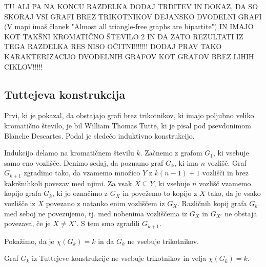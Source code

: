 \documentclass[mat1, tisk]{fmfdelo}
\begin{document}
TU ALI PA NA KONCU RAZDELKA DODAJ TRDITEV IN DOKAZ, DA SO SKORAJ VSI GRAFI BREZ TRIKOTNIKOV DEJANSKO DVODELNI GRAFI (V mapi imaš članek
"Almost all triangle-free graphs are bipartite") IN IMAJO KOT TAKŠNI KROMATIČNO ŠTEVILO 2 IN DA ZATO REZULTATI IZ TEGA RAZDELKA RES NISO 
OČITNI!!!!!!! DODAJ PRAV TAKO KARAKTERIZACIJO DVODELNIH GRAFOV KOT GRAFOV BREZ LIHIH CIKLOV!!!!!

\subsection{Tuttejeva konstrukcija}
Prvi, ki je pokazal, da obstajajo grafi brez trikotnikov, ki imajo poljubno veliko kromatično število, je bil William Thomas Tutte, ki je
pisal pod psevdonimom Blanche Descartes. Podal je sledečo induktivno konstrukcijo.

Indukcijo delamo na kromatičnem številu $k$. Začnemo z grafom $G_1$, ki vsebuje samo eno vozlišče. Denimo sedaj, da poznamo graf $G_k$, 
ki ima $n$ vozlišč. Graf $G_{k+1}$ zgradimo tako, da vzamemo množico $Y$ z $k(n - 1) + 1$ vozlišči in brez kakršnihkoli povezav med njimi. 
Za vsak $X \subseteq Y$, ki vsebuje $n$ vozlišč vzamemo kopijo grafa $G_k$, ki jo označimo z $G_X$ in povežemo to kopijo z $X$ tako, da je 
vsako vozlišče iz $X$ povezano z natanko enim vozliščem iz $G_X$. Različnih kopij grafa $G_k$ med seboj ne povezujemo, tj. med nobenima 
vozliščema iz $G_X$ in $G_{X'}$ ne obstaja povezava, če je $X \neq X'$. S tem smo zgradili $G_{k+1}$.

Pokažimo, da je $\chi(G_k) = k$ in da $G_k$ ne vsebuje trikotnikov.

    \begin{trditev}
        Graf $G_k$ iz Tuttejeve konstrukcije ne vsebuje trikotnikov in velja $\chi(G_k) = k$.
    \end{trditev}
    
\end{document}

